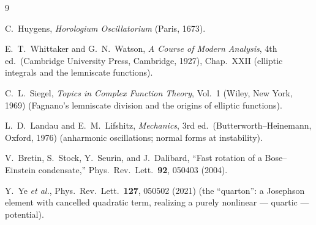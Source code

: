 \documentclass[11pt,a4paper]{article}
\begin{document}
\begin{thebibliography}{9}

 C.~Huygens, \emph{Horologium Oscillatorium} (Paris, 1673).

 E.~T.~Whittaker and G.~N.~Watson, \emph{A Course of Modern
Analysis}, 4th ed.\ (Cambridge University Press, Cambridge, 1927),
Chap.~XXII (elliptic integrals and the lemniscate functions).

 C.~L.~Siegel, \emph{Topics in Complex Function Theory},
Vol.~1 (Wiley, New York, 1969) (Fagnano's lemniscate division and the
origins of elliptic functions).

 L.~D.~Landau and E.~M.~Lifshitz, \emph{Mechanics}, 3rd ed.\
(Butterworth--Heinemann, Oxford, 1976) (anharmonic oscillations; normal
forms at instability).

 V.~Bretin, S.~Stock, Y.~Seurin, and J.~Dalibard,
``Fast rotation of a Bose--Einstein condensate,''
Phys.\ Rev.\ Lett.\ \textbf{92}, 050403 (2004).

 Y.~Ye \emph{et al.}, Phys.\ Rev.\ Lett.\ \textbf{127},
050502 (2021) (the ``quarton'': a Josephson element with cancelled quadratic
term, realizing a purely nonlinear --- quartic --- potential).

\end{thebibliography}
\end{document}
